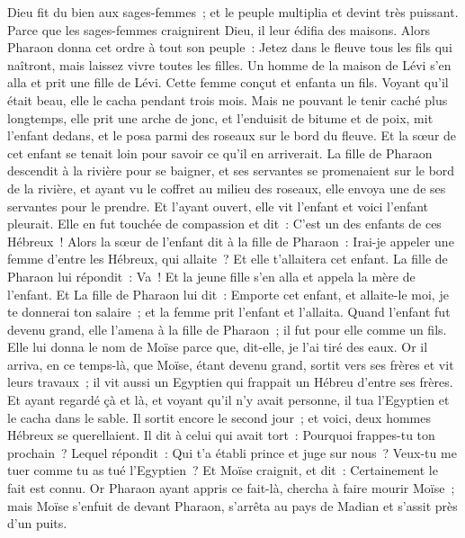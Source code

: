 \begin{multicols}{2}
Dieu fit du bien aux sages-femmes~; et le peuple multiplia et devint très puissant.
Parce que les sages-femmes craignirent Dieu, il leur édifia des maisons.
Alors Pharaon donna cet ordre à tout son peuple~: Jetez dans le fleuve tous les fils qui naîtront, mais laissez vivre toutes les filles.
\VerseOne{}Un homme de la maison de Lévi s'en alla et prit une fille de Lévi.
Cette femme conçut et enfanta un fils. Voyant qu'il était beau, elle le cacha pendant trois mois.
Mais ne pouvant le tenir caché plus longtemps, elle prit une arche de jonc, et l'enduisit de bitume et de poix, mit l'enfant dedans, et le posa parmi des roseaux sur le bord du fleuve.
Et la sœur de cet enfant se tenait loin pour savoir ce qu'il en arriverait.
La fille de Pharaon descendit à la rivière pour se baigner, et ses servantes se promenaient sur le bord de la rivière, et ayant vu le coffret au milieu des roseaux, elle envoya une de ses servantes pour le prendre.
Et l'ayant ouvert, elle vit l'enfant et voici l'enfant pleurait. Elle en fut touchée de compassion et dit~: C'est un des enfants de ces Hébreux~!
Alors la sœur de l'enfant dit à la fille de Pharaon~: Irai-je appeler une femme d'entre les Hébreux, qui allaite~? Et elle t'allaitera cet enfant.
La fille de Pharaon lui répondit~: Va~! Et la jeune fille s'en alla et appela la mère de l'enfant.
Et La fille de Pharaon lui dit~: Emporte cet enfant, et allaite-le moi, je te donnerai ton salaire~; et la femme prit l'enfant et l'allaita.
Quand l'enfant fut devenu grand, elle l'amena à la fille de Pharaon~; il fut pour elle comme un fils. Elle lui donna le nom de Moïse parce que, dit-elle, je l'ai tiré des eaux.
Or il arriva, en ce temps-là, que Moïse, étant devenu grand, sortit vers ses frères et vit leurs travaux~; il vit aussi un Egyptien qui frappait un Hébreu d'entre ses frères.
Et ayant regardé çà et là, et voyant qu'il n'y avait personne, il tua l'Egyptien et le cacha dans le sable.
Il sortit encore le second jour~; et voici, deux hommes Hébreux se querellaient. Il dit à celui qui avait tort~: Pourquoi frappes-tu ton prochain~?
Lequel répondit~: Qui t'a établi prince et juge sur nous~? Veux-tu me tuer comme tu as tué l'Egyptien~? Et Moïse craignit, et dit~: Certainement le fait est connu.
Or Pharaon ayant appris ce fait-là, chercha à faire mourir Moïse~; mais Moïse s'enfuit de devant Pharaon, s'arrêta au pays de Madian et s'assit près d'un puits.

\end{multicols}
